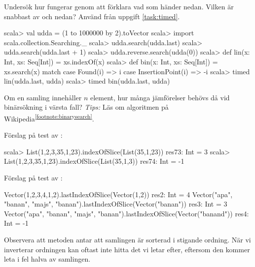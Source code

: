 Undersök hur  fungerar genom att förklara vad som händer nedan. Vilken är snabbast av  och  nedan? Använd  från uppgift \ref{task:timed}.

\begin{REPL}
scala> val udda = (1 to 1000000 by 2).toVector
scala> import scala.collection.Searching._
scala> udda.search(udda.last)
scala> udda.search(udda.last + 1)
scala> udda.reverse.search(udda(0))
scala> def lin(x: Int, xs: Seq[Int]) = xs.indexOf(x)
scala> def bin(x: Int, xs: Seq[Int]) = xs.search(x) match {
         case Found(i) => i
         case InsertionPoint(i) => -i
       }
scala> timed{ lin(udda.last, udda) }
scala> timed{ bin(udda.last, udda) }
\end{REPL}

\Subtask Om en samling innehåller $n$ element, hur många jämförelser behövs då vid binärsökning i värsta fall? \emph{Tips:} Läs om algoritmen på Wikipedia\textsuperscript{\ref{footnote:binarysearch}}.


\SOLUTION


\TaskSolved \what


\SubtaskSolved
Förslag på test av :
\begin{REPLnonum}
scala> List(1,2,3,35,1,23).indexOfSlice(List(35,1,23))
res73: Int = 3
scala> List(1,2,3,35,1,23).indexOfSlice(List(35,1,3))
res74: Int = -1
\end{REPLnonum}

\SubtaskSolved
Förslag på test av :
\begin{REPLnonum}
Vector(1,2,3,4,1,2).lastIndexOfSlice(Vector(1,2))
res2: Int = 4
Vector("apa", "banan", "majs", "banan").lastIndexOfSlice(Vector("banan"))
res3: Int = 3
Vector("apa", "banan", "majs", "banan").lastIndexOfSlice(Vector("banand"))
res4: Int = -1
\end{REPLnonum}

\SubtaskSolved
Observera att metoden  antar att samlingen är sorterad i stigande ordning. När vi inverterar ordningen kan  oftast inte hitta det vi letar efter, eftersom den kommer leta i fel halva av samlingen.

